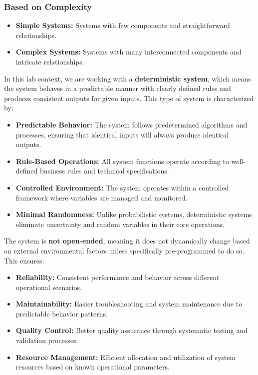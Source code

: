\documentclass[12pt,a4paper]{article}
\begin{document}
\subsubsection{Based on Complexity}
\begin{itemize}
    \item \textbf{Simple Systems:} Systems with few components and straightforward relationships.
    \item \textbf{Complex Systems:} Systems with many interconnected components and intricate relationships.
\end{itemize}

In this lab context, we are working with a \textbf{deterministic system}, which means the system behaves in a predictable manner with clearly defined rules and produces consistent outputs for given inputs. This type of system is characterized by:

\begin{itemize}
    \item \textbf{Predictable Behavior:} The system follows predetermined algorithms and processes, ensuring that identical inputs will always produce identical outputs.
    \item \textbf{Rule-Based Operations:} All system functions operate according to well-defined business rules and technical specifications.
    \item \textbf{Controlled Environment:} The system operates within a controlled framework where variables are managed and monitored.
    \item \textbf{Minimal Randomness:} Unlike probabilistic systems, deterministic systems eliminate uncertainty and random variables in their core operations.
\end{itemize}

The system is \textbf{not open-ended}, meaning it does not dynamically change based on external environmental factors unless specifically pre-programmed to do so. This ensures:

\begin{itemize}
    \item \textbf{Reliability:} Consistent performance and behavior across different operational scenarios.
    \item \textbf{Maintainability:} Easier troubleshooting and system maintenance due to predictable behavior patterns.
    \item \textbf{Quality Control:} Better quality assurance through systematic testing and validation processes.
    \item \textbf{Resource Management:} Efficient allocation and utilization of system resources based on known operational parameters.
\end{itemize}
\end{document}
